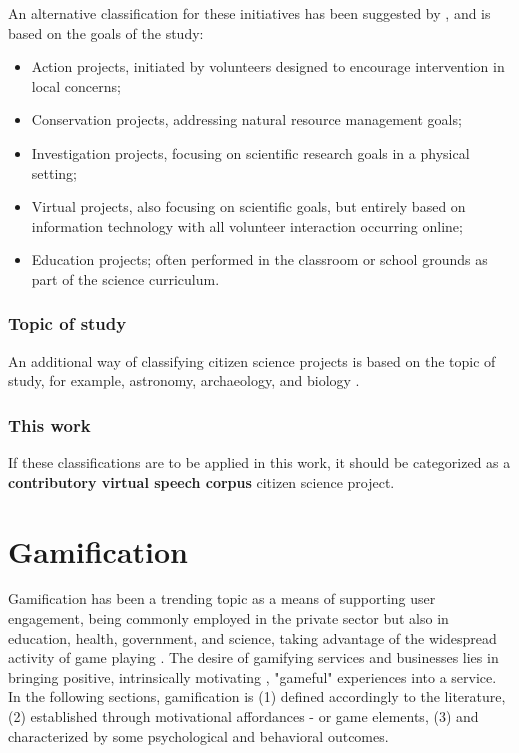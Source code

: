 An alternative classification for these initiatives has been suggested by \cite{wiggins2011conservation}, and is based on the goals of the study:

\begin{itemize}
    \item Action projects, initiated by volunteers designed to encourage intervention in local concerns;
    \item Conservation projects, addressing natural resource management goals;
    \item Investigation projects, focusing on scientific research goals in a physical setting;
    \item Virtual projects, also focusing on scientific goals, but entirely based on information technology with all volunteer interaction occurring online;
    \item Education projects; often performed in the classroom or school grounds as part of the science curriculum.
\end{itemize}

\subsubsection{Topic of study}

An additional way of classifying citizen science projects is based on the topic of study, for example, astronomy, archaeology, and biology \cite{wiggins2011conservation}. 

\subsubsection{This work}

If these classifications are to be applied in this work, it should be categorized as a \textbf{contributory virtual speech corpus} citizen science project.

\section{Gamification}

Gamification has been a trending topic as a means of supporting user engagement, being commonly employed in the private sector but also in education, health, government, and science, taking advantage of the widespread activity of game playing \cite{kreitmair2019citizen}. The desire of gamifying services and businesses lies in bringing positive, intrinsically motivating \cite{ryan2000self}, "gameful" experiences \cite{huotari2012defining} into a service. In the following sections, gamification is (1) defined accordingly to the literature, (2) established through motivational affordances - or game elements, (3) and characterized by some psychological and behavioral outcomes.

